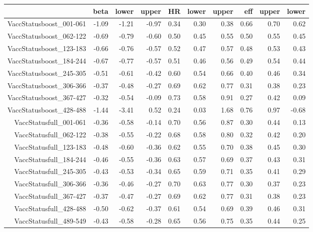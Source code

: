\begin{table}[ht]
\centering
\begin{tabular}{rrrrrrrrrr}
  \hline
 & beta & lower & upper & HR & lower & upper & eff & upper & lower \\ 
  \hline
VaccStatusboost\_001-061 & -1.09 & -1.21 & -0.97 & 0.34 & 0.30 & 0.38 & 0.66 & 0.70 & 0.62 \\ 
  VaccStatusboost\_062-122 & -0.69 & -0.79 & -0.60 & 0.50 & 0.45 & 0.55 & 0.50 & 0.55 & 0.45 \\ 
  VaccStatusboost\_123-183 & -0.66 & -0.76 & -0.57 & 0.52 & 0.47 & 0.57 & 0.48 & 0.53 & 0.43 \\ 
  VaccStatusboost\_184-244 & -0.67 & -0.77 & -0.57 & 0.51 & 0.46 & 0.56 & 0.49 & 0.54 & 0.44 \\ 
  VaccStatusboost\_245-305 & -0.51 & -0.61 & -0.42 & 0.60 & 0.54 & 0.66 & 0.40 & 0.46 & 0.34 \\ 
  VaccStatusboost\_306-366 & -0.37 & -0.48 & -0.27 & 0.69 & 0.62 & 0.77 & 0.31 & 0.38 & 0.23 \\ 
  VaccStatusboost\_367-427 & -0.32 & -0.54 & -0.09 & 0.73 & 0.58 & 0.91 & 0.27 & 0.42 & 0.09 \\ 
  VaccStatusboost\_428-488 & -1.44 & -3.41 & 0.52 & 0.24 & 0.03 & 1.68 & 0.76 & 0.97 & -0.68 \\ 
  VaccStatusfull\_001-061 & -0.36 & -0.58 & -0.14 & 0.70 & 0.56 & 0.87 & 0.30 & 0.44 & 0.13 \\ 
  VaccStatusfull\_062-122 & -0.38 & -0.55 & -0.22 & 0.68 & 0.58 & 0.80 & 0.32 & 0.42 & 0.20 \\ 
  VaccStatusfull\_123-183 & -0.48 & -0.60 & -0.36 & 0.62 & 0.55 & 0.70 & 0.38 & 0.45 & 0.30 \\ 
  VaccStatusfull\_184-244 & -0.46 & -0.55 & -0.36 & 0.63 & 0.57 & 0.69 & 0.37 & 0.43 & 0.31 \\ 
  VaccStatusfull\_245-305 & -0.43 & -0.53 & -0.34 & 0.65 & 0.59 & 0.71 & 0.35 & 0.41 & 0.29 \\ 
  VaccStatusfull\_306-366 & -0.36 & -0.46 & -0.27 & 0.70 & 0.63 & 0.77 & 0.30 & 0.37 & 0.23 \\ 
  VaccStatusfull\_367-427 & -0.37 & -0.47 & -0.27 & 0.69 & 0.62 & 0.77 & 0.31 & 0.38 & 0.23 \\ 
  VaccStatusfull\_428-488 & -0.50 & -0.62 & -0.37 & 0.61 & 0.54 & 0.69 & 0.39 & 0.46 & 0.31 \\ 
  VaccStatusfull\_489-549 & -0.43 & -0.58 & -0.28 & 0.65 & 0.56 & 0.75 & 0.35 & 0.44 & 0.25 \\ 

\end{tabular}
\end{table}
